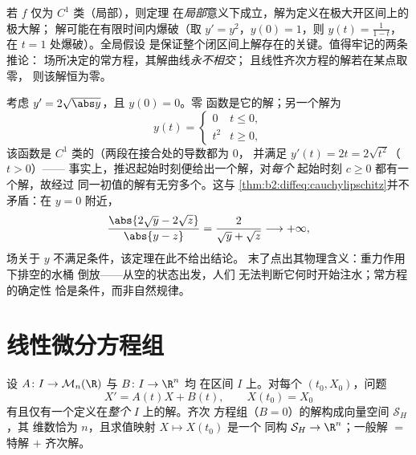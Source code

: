 \begin{remark}
若 $f$ 仅为 $C^1$ 类（局部），则定理
在\emph{局部}意义下成立，解为定义在极大开区间上的极大解；
解可能在有限时间内爆破（取 $y' = y^2$，$y(0) = 1$，则 $y(t)
= \frac{1}{1-t}$，在 $t = 1$ 处爆破）。全局假设
是保证整个闭区间上解存在的关键。值得牢记的两条推论：
场所决定的常方程，其解曲线\emph{永不相交}；
且线性齐次方程的解若在某点取零，
则该解恒为零。
\end{remark}

\begin{example}\label{ex:b2:diffeq:leaky}
考虑 $y' = 2\sqrt{\abs y}$，且 $y(0) = 0$。零
函数是它的解；另一个解为
\[
y(t) = \begin{cases} 0 & t \leq 0,\\ t^2 & t \geq 0,
\end{cases}
\]
该函数是 $C^1$ 类的（两段在接合处的导数都为 $0$，
并满足 $y'(t) = 2t = 2\sqrt{t^2}$（$t > 0$）——
事实上，推迟起始时刻便给出一个解，对\emph{每个}
起始时刻 $c \geq 0$ 都有一个解，故经过
同一初值的解有无穷多个。这与
\cref{thm:b2:diffeq:cauchylipschitz}并不矛盾：在 $y = 0$ 附近，
\[
\frac{\abs{2\sqrt y - 2\sqrt z}}{\abs{y - z}}
= \frac{2}{\sqrt y + \sqrt z} \longrightarrow +\infty ,
\]
场关于 $y$ 不满足条件，该定理在此不给出结论。
末了点出其物理含义：重力作用下排空的水桶
倒放——从空的状态出发，人们
无法判断它何时开始注水；常方程的确定性
恰是条件，而非自然规律。
\end{example}

\section{线性微分方程组}

\begin{theorem}[线性微分方程组的结构]\label{thm:b2:diffeq:linear}
设 $A \colon I \to \mathcal{M}_n(\R)$ 与 $B \colon I \to \R^n$ 均
在区间 $I$ 上。对每个 $(t_0, X_0)$，问题
\[
X' = A(t)X + B(t), \qquad X(t_0) = X_0
\]
有且仅有一个定义在\emph{整个} $I$ 上的解。齐次
方程组（$B = 0$）的解构成向量空间 $\mathcal{S}_H$，其
维数恰为 $n$，且求值映射 $X \mapsto X(t_0)$ 是一个
同构 $\mathcal{S}_H \to \R^n$；一般解 $=$
特解 $+$ 齐次解。
\end{theorem}

